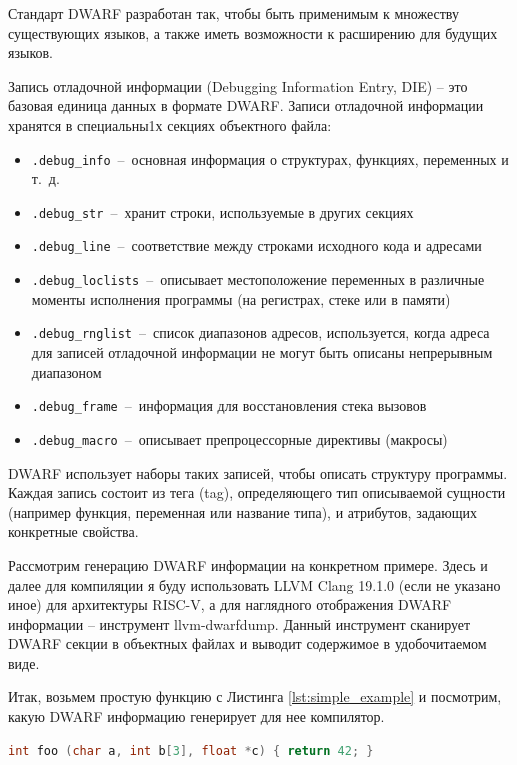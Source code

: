 Стандарт DWARF разработан так, чтобы быть применимым к множеству существующих языков, а также
иметь возможности к расширению для будущих языков.

Запись отладочной информации (Debugging Information Entry, DIE) -- это базовая единица
данных в формате DWARF. Записи отладочной информации хранятся в специальны1х секциях
объектного файла:

\begin{itemize}
\item \texttt{.debug\_info}~--~основная информация о структурах, функциях, переменных и т.~д.
\item \texttt{.debug\_str}~--~хранит строки, используемые в других секциях
\item \texttt{.debug\_line}~--~соответствие между строками исходного кода и адресами
\item \texttt{.debug\_loclists}~--~описывает местоположение переменных в различные моменты
исполнения программы (на регистрах, стеке или в памяти)
\item \texttt{.debug\_rnglist}~--~список диапазонов адресов, используется, когда адреса
для записей отладочной информации не могут быть описаны непрерывным диапазоном
\item \texttt{.debug\_frame}~--~информация для восстановления стека вызовов
\item \texttt{.debug\_macro}~--~описывает препроцессорные директивы (макросы)
\end{itemize}

DWARF использует наборы таких записей, чтобы описать структуру программы. Каждая запись
состоит из тега (tag), определяющего тип описываемой сущности (например функция, переменная
или название типа), и атрибутов, задающих конкретные свойства.

Рассмотрим генерацию DWARF информации на конкретном примере. Здесь и далее для компиляции
я буду использовать LLVM Clang 19.1.0 (если не указано иное) для архитектуры RISC-V,
а для наглядного отображения DWARF информации -- инструмент llvm-dwarfdump.
Данный инструмент сканирует DWARF секции в
объектных файлах и выводит содержимое в удобочитаемом виде.

Итак, возьмем простую функцию с Листинга \ref{lst:simple_example} и посмотрим, какую
DWARF информацию генерирует для нее компилятор.

\begin{samepage}
\begin{lstlisting}[language=C++, caption=Пример простейшей функции, label=lst:simple_example]
int foo (char a, int b[3], float *c) { return 42; }
\end{lstlisting}
\end{samepage}

